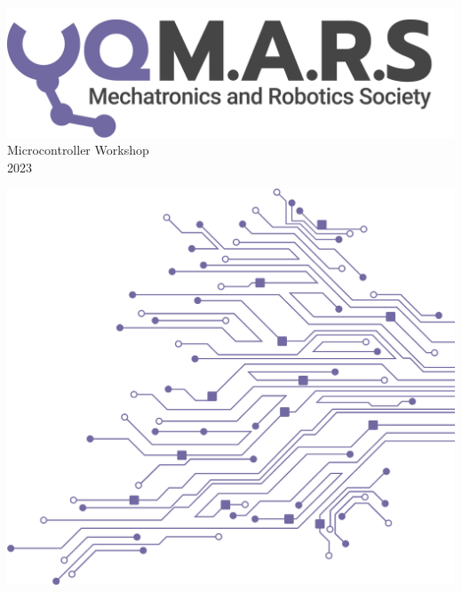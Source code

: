 \documentclass[a4paper,12pt]{report}
\begin{document}
\begin{titlepage}
    \begin{center}
        \vspace*{15mm}
        \includegraphics[width=0.7\paperwidth]{Assets/Logo (Dark).png} \\
        \vspace{1cm}
        \Huge Microcontroller Workshop \\
        \huge \textcolor{turbo_purple}{2023}
    \end{center}
    \vfill
    \includegraphics[height=0.5\paperheight, right]{Assets/Pattern - PCB (Solid).png}
    \vspace*{10mm}
\end{titlepage}
\restoregeometry
\end{document}
